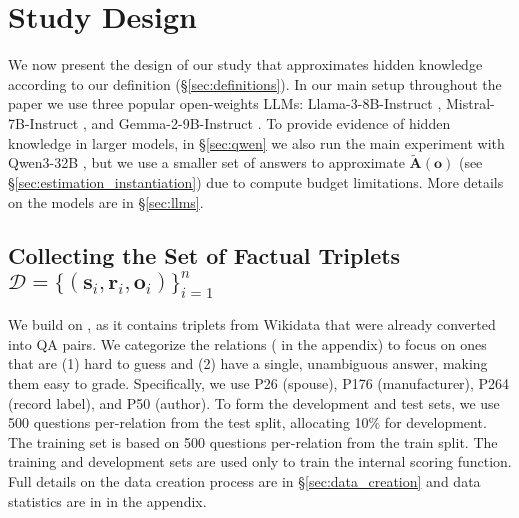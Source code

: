 
\vspace{-5pt}
\section{Study Design}
\label{sec:exp_setting}
\vspace{-5pt}

We now present the design of our study that approximates hidden knowledge according to our definition (\S \ref{sec:definitions}).
In our main setup throughout the paper we use three popular open-weights LLMs: \textsf{Llama-3-8B-Instruct} \citep{dubey2024llama},
\textsf{Mistral-7B-Instruct} \citep{jiang2023mistral},
and \textsf{Gemma-2-9B-Instruct} \citep{team2024gemma}.
To provide evidence of hidden knowledge in larger models, in \S \ref{sec:qwen} we also run the main experiment with \textsf{Qwen3-32B} \citep{yang2025qwen3}, but we use a smaller set of answers to approximate $\mathbf{\tilde{A}(o)}$ (see \S \ref{sec:estimation_instantiation}) due to compute budget limitations.
More details on the models are in \S \ref{sec:llms}.



\subsection{\texorpdfstring{Collecting the Set of Factual Triplets $\mathcal{D} = \{ (\mathbf{s}_i,\mathbf{r}_i,\mathbf{o}_i) \}_{i=1}^n$}{Collecting the Set of Factual Triplets D}}
\label{sec:dataset}

We build on \eq \citep{Entity_Questions}, as it contains triplets from Wikidata \citep{Wikidata} that were already converted into QA pairs. We categorize the relations ( in the appendix) to focus on ones that are (1) hard to guess and (2) have a single, unambiguous answer, making them easy to grade. Specifically, we use P26 (spouse), P176 (manufacturer), P264 (record label), and P50 (author). 
To form the development and test sets, we use 500 questions per-relation from the \eq test split, allocating 10\% for development. The training set is based on 500 questions per-relation from the \eq train split.
The training and development sets are used only to train the internal scoring function. Full details on the data creation process are in \S \ref{sec:data_creation} and data statistics are in  in the appendix.


